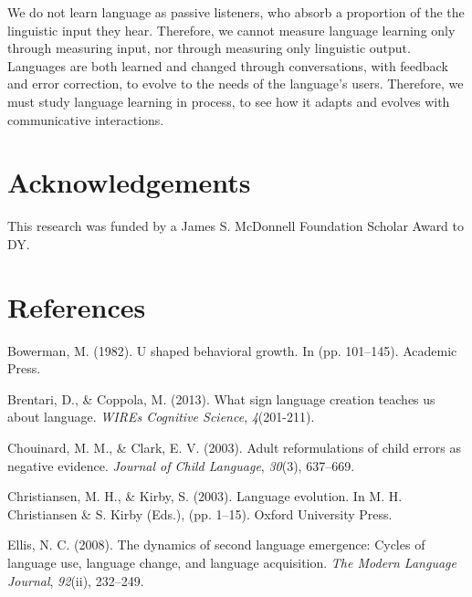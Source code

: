 \documentclass[10pt, letterpaper]{article}
\begin{document}
We do not learn language as passive listeners, who absorb a proportion
of the the linguistic input they hear. Therefore, we cannot measure
language learning only through measuring input, nor through measuring
only linguistic output. Languages are both learned and changed through
conversations, with feedback and error correction, to evolve to the
needs of the language's users. Therefore, we must study language
learning in process, to see how it adapts and evolves with communicative
interactions.

\vspace{1em} 

\hypertarget{acknowledgements}{%
\section{Acknowledgements}\label{acknowledgements}}

This research was funded by a James S. McDonnell Foundation Scholar
Award to DY.

\hypertarget{references}{%
\section{References}\label{references}}

\setlength{\parindent}{-0.1in} 
\setlength{\leftskip}{0.125in}

\noindent

\hypertarget{refs}{}
\leavevmode\hypertarget{ref-bowerman-1982}{}%
Bowerman, M. (1982). U shaped behavioral growth. In (pp. 101--145).
Academic Press.

\leavevmode\hypertarget{ref-brentari-2013}{}%
Brentari, D., \& Coppola, M. (2013). What sign language creation teaches
us about language. \emph{WIREs Cognitive Science}, \emph{4}(201-211).

\leavevmode\hypertarget{ref-chouinard-2003}{}%
Chouinard, M. M., \& Clark, E. V. (2003). Adult reformulations of child
errors as negative evidence. \emph{Journal of Child Language},
\emph{30}(3), 637--669.

\leavevmode\hypertarget{ref-christiansen-2003}{}%
Christiansen, M. H., \& Kirby, S. (2003). Language evolution. In M. H.
Christiansen \& S. Kirby (Eds.), (pp. 1--15). Oxford University Press.

\leavevmode\hypertarget{ref-ellis-2008}{}%
Ellis, N. C. (2008). The dynamics of second language emergence: Cycles
of language use, language change, and language acquisition. \emph{The
Modern Language Journal}, \emph{92}(ii), 232--249.
\end{document}
